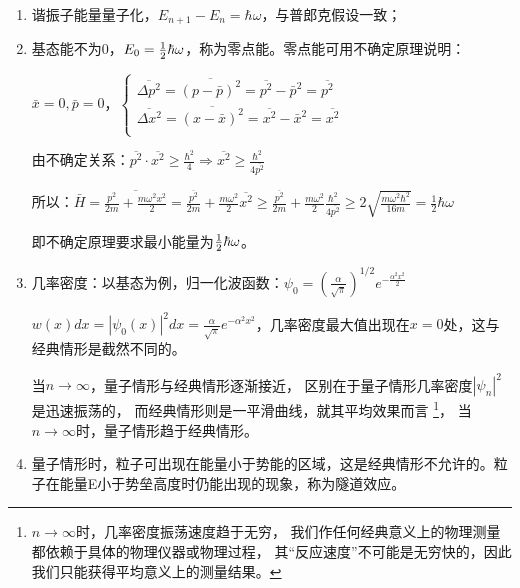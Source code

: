 \begin{enumerate}
    \item 谐振子能量量子化，$E_{n + 1}  - E_n  = \hbar \omega $，与普郎克假设一致；

    \item 基态能不为0，$E_0  = {\textstyle{1 \over 2}}\hbar \omega $，称为零点能。零点能可用不确定原理说明：

$\bar x = 0,\bar p = 0$，$\left\{ \begin{array}{l}
 \overline {\Delta p^2 }  = \overline {\left( {p - \bar p} \right)^2 }  = \overline {p^2 }  - \bar p^2  = \overline {p^2 }  \\
 \overline {\Delta x^2 }  = \overline {\left( {x - \bar x} \right)^2 }  = \overline {x^2 }  - \bar x^2  = \overline {x^2 }  \\
 \end{array} \right.$

由不确定关系：$\overline {p^2 }  \cdot \overline {x^2 }  \ge \frac{{\hbar ^2 }}{4} \Rightarrow \overline {x^2 }  \ge \frac{{\hbar ^2 }}{{4\overline {p^2 } }}$

所以：$\bar H = \overline {\frac{{p^2 }}{{2m}} + \frac{{m\omega ^2 x^2 }}{2}}  = \frac{{\overline {p^2 } }}{{2m}} + \frac{{m\omega ^2 }}{2}\overline {x^2 }  \ge \frac{{\overline {p^2 } }}{{2m}} + \frac{{m\omega ^2 }}{2}\frac{{\hbar ^2 }}{{4\overline {p^2 } }} \ge 2\sqrt {\frac{{m\omega ^2 \hbar ^2 }}{{16m}}}  = \frac{1}{2}\hbar \omega $

即不确定原理要求最小能量为${\textstyle{1 \over 2}}\hbar \omega $。

    \item 几率密度：以基态为例，归一化波函数：$\psi _0  = \left( {\frac{\alpha }{{\sqrt \pi  }}} \right)^{1/2} e^{ - \frac{{\alpha ^2 x^2 }}{2}} $

$w\left( x \right)dx = \left| {\psi _0 \left( x \right)} \right|^2 dx = \frac{\alpha }{{\sqrt \pi  }}e^{ - \alpha ^2 x^2 } $，几率密度最大值出现在$x=0$处，这与经典情形是截然不同的。

当$n \to \infty $，量子情形与经典情形逐渐接近，
区别在于量子情形几率密度$\left| {\psi _n } \right|^2 $是迅速振荡的，
而经典情形则是一平滑曲线，就其平均效果而言
\footnote{$n \to \infty $时，几率密度振荡速度趋于无穷，
我们作任何经典意义上的物理测量都依赖于具体的物理仪器或物理过程，
其``反应速度''不可能是无穷快的，因此我们只能获得平均意义上的测量结果。}，
当$n \to \infty $时，量子情形趋于经典情形。

    \item 量子情形时，粒子可出现在能量小于势能的区域，这是经典情形不允许的。粒子在能量E小于势垒高度时仍能出现的现象，称为隧道效应。
   \end{enumerate}


